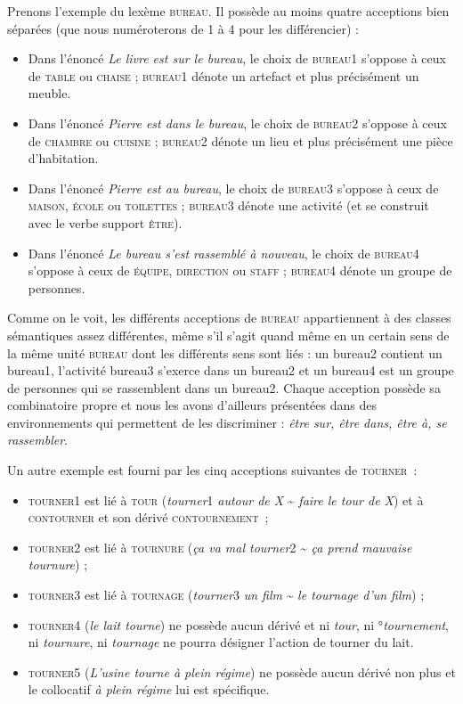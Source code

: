 Prenons l’exemple du lexème \textsc{bureau}. Il possède au moins quatre acceptions bien séparées (que nous numéroterons de 1 à 4 pour les différencier) :

\begin{itemize}
\item Dans l’énoncé \textit{Le livre est sur le bureau}, le choix de \textsc{bureau1} s’oppose à ceux de \textsc{table} ou \textsc{chaise} ; \textsc{bureau1} dénote un artefact et plus précisément un meuble.
\item Dans l’énoncé \textit{Pierre est dans le bureau}, le choix de \textsc{bureau2} s’oppose à ceux de \textsc{chambre} ou \textsc{cuisine} ; \textsc{bureau2} dénote un lieu et plus précisément une pièce d’habitation.
\item Dans l’énoncé \textit{Pierre est au bureau}, le choix de \textsc{bureau3} s’oppose à ceux de \textsc{maison,} \textsc{école} ou \textsc{toilettes} ; \textsc{bureau3} dénote une activité (et se construit avec le verbe support \textsc{être}).
\item Dans l’énoncé \textit{Le bureau s’est rassemblé à nouveau}, le choix de \textsc{bureau4} s’oppose à ceux de \textsc{équipe,} \textsc{direction} ou \textsc{staff} ; \textsc{bureau4} dénote un groupe de personnes.
\end{itemize}

Comme on le voit, les différents acceptions de \textsc{bureau} appartiennent à des classes sémantiques assez différentes, même s’il s’agit quand même en un certain sens de la même unité \textsc{bureau} dont les différents sens sont liés : un bureau2 contient un bureau1, l’activité bureau3 s’exerce dans un bureau2 et un bureau4 est un groupe de personnes qui se rassemblent dans un bureau2. Chaque acception possède sa combinatoire propre et nous les avons d’ailleurs présentées dans des environnements qui permettent de les discriminer : \textit{être sur, être dans, être à, se rassembler}.

Un autre exemple est fourni par les cinq acceptions suivantes de \textsc{tourner~}:

\begin{itemize}
\item \textsc{tourner1} est lié à \textsc{tour} (\textit{tourner}1 \textit{autour de X} {\textasciitilde} \textit{faire le tour de X}) et à \textsc{contourner} et son dérivé \textsc{contournement~};
\item \textsc{tourner2} est lié à \textsc{tournure} (\textit{ça va mal tourner}2 {\textasciitilde} \textit{ça prend mauvaise tournure}) ;
\item \textsc{tourner3} est lié à \textsc{tournage} (\textit{tourner}3 \textit{un film} {\textasciitilde} \textit{le tournage d’un film}) ;
\item \textsc{tourner4} (\textit{le lait tourne}) ne possède aucun dérivé et ni \textit{tour}, ni °\textit{tournement}, ni \textit{tournure}, ni \textit{tournage} ne pourra désigner l’action de tourner du lait.
\item \textsc{tourner5} (\textit{L’usine tourne à plein régime}) ne possède aucun dérivé non plus et le collocatif \textit{à plein régime} lui est spécifique.
\end{itemize}

